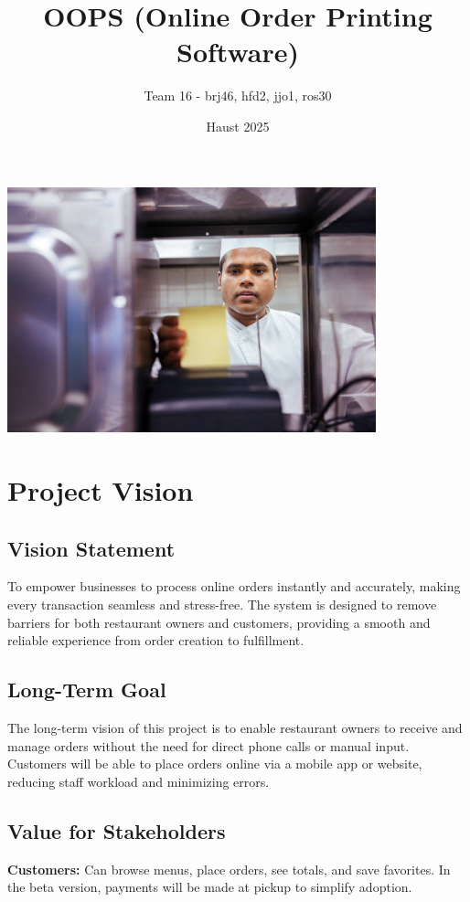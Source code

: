 \documentclass{article}
\title{OOPS (Online Order Printing Software)}
\author{Team 16 - brj46, hfd2, jjo1, ros30}
\date{Haust 2025}
\begin{document}
\maketitle

\vspace{5em}
\begin{center}
    \includegraphics[width=0.8\textwidth]{imgs/order-in-kitchen.jpg}
\end{center}
\section{Project Vision}

\subsection{Vision Statement}
To empower businesses to process online orders instantly and accurately, making every transaction seamless and stress-free. The system is designed to remove barriers for both restaurant owners and customers, providing a smooth and reliable experience from order creation to fulfillment.

\subsection{Long-Term Goal}
The long-term vision of this project is to enable restaurant owners to receive and manage orders without the need for direct phone calls or manual input. Customers will be able to place orders online via a mobile app or website, reducing staff workload and minimizing errors.

\subsection{Value for Stakeholders}
\textbf{Customers:} Can browse menus, place orders, see totals, and save favorites. In the beta version, payments will be made at pickup to simplify adoption.\\
\end{document}
